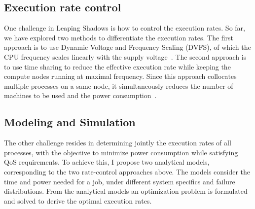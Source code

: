 

\subsection{Execution rate control}
\vspace*{-2mm}
One challenge in Leaping Shadows is how to control the execution rates. So far, we have explored two methods to differentiate the execution rates. The first approach is to use Dynamic Voltage and Frequency Scaling (DVFS), of which the CPU frequency scales linearly with the supply voltage~\cite{cui_en7085151,cui_closer_2014}. The second approach is to use time sharing to reduce the effective execution rate while keeping the compute nodes running at maximal frequency. Since this approach collocates multiple processes  on a same node, it simultaneously reduces the number of machines to be used and the power consumption~\cite{cui_ics_2015}.

\subsection{Modeling and Simulation}
\vspace*{-2mm}
The other challenge resides in determining
jointly the execution rates of all processes, %
with the objective to minimize power consumption while satisfying QoS requirements. To achieve this, I propose two analytical
models, corresponding to the two rate-control approaches above. The models consider the time and power needed for a job, %
under different system specifics and failure distributions. From the analytical models an optimization problem is formulated and solved to derive the optimal execution rates.  %

